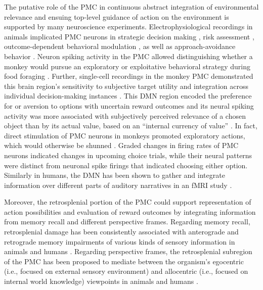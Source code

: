\documentclass[10pt,letterpaper]{article}
\begin{document}
The putative role of the PMC in continuous abstract integration of
environmental relevance
and ensuing top-level guidance of action on the environment is supported
by many neuroscience experiments.
Electrophysiological recordings in animals implicated PMC neurons in
strategic decision making \citep{pearson2009neurons},
risk assessment \citep{mccoy2005risk},
outcome-dependent behavioral modulation \citep{hayden2009electrophysiological},
as well as approach-avoidance behavior
\citep{vann2009does}.
Neuron spiking activity in the PMC allowed distinguishing
whether a monkey would pursue an exploratory or exploitative
behavioral strategy during food foraging \citep{pearson2009neurons}.
Further, single-cell recordings in the monkey PMC
demonstrated this brain region's sensitivity to
subjective target utility \citep{mccoy2005risk} and integration
across individual decision-making instances \citep{pearson2009neurons}.
This DMN region encoded the
preference for or aversion to options with uncertain reward outcomes
and its neural spiking activity was more associated with
subjectively perceived relevance of a chosen object
than by its actual value,
based on an ``internal currency of value'' \citep{mccoy2005risk}.
In fact, direct stimulation of PMC neurons in monkeys
promoted exploratory actions,
which would otherwise be shunned \citep{hayden2008stim}.
Graded changes in firing rates of PMC neurons
indicated changes in upcoming choice trials, while their neural patterns were
distinct from neuronal spike firings that indicated choosing either option.
Similarly in humans,
the DMN has been shown to gather and integrate information
over different parts of auditory narratives in an fMRI study
\citep{simony2016dynamic}.


Moreover, the retrosplenial portion of the PMC could support
representation of action possibilities
and evaluation of reward outcomes by integrating
information from memory recall and different perspective frames.
Regarding memory recall, retrosplenial damage has been
consistently associated with anterograde and retrograde memory impairments
of various kinds of sensory information
in animals and humans
\citep{vann2009does}.
Regarding perspective frames, the retrosplenial subregion of the PMC has been
proposed to mediate between the organism's egocentric
(i.e., focused on external sensory environment) and
allocentric (i.e., focused on internal world knowledge) viewpoints
in animals and humans
\citep{epstein2008parahippocampal, burgess2008spatial, valiquette2007different}.
\end{document}
